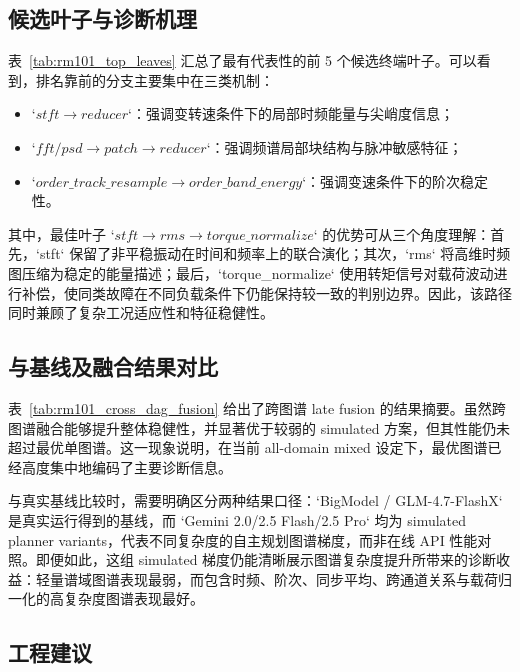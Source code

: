 \subsection{候选叶子与诊断机理}

表~\ref{tab:rm101_top_leaves} 汇总了最有代表性的前 5 个候选终端叶子。可以看到，排名靠前的分支主要集中在三类机制：

\begin{itemize}
    \item `$stft \rightarrow reducer$`：强调变转速条件下的局部时频能量与尖峭度信息；
    \item `$fft/psd \rightarrow patch \rightarrow reducer$`：强调频谱局部块结构与脉冲敏感特征；
    \item `$order\_track\_resample \rightarrow order\_band\_energy$`：强调变速条件下的阶次稳定性。
\end{itemize}



其中，最佳叶子 `$stft \rightarrow rms \rightarrow torque\_normalize$` 的优势可从三个角度理解：首先，`stft` 保留了非平稳振动在时间和频率上的联合演化；其次，`rms` 将高维时频图压缩为稳定的能量描述；最后，`torque\_normalize` 使用转矩信号对载荷波动进行补偿，使同类故障在不同负载条件下仍能保持较一致的判别边界。因此，该路径同时兼顾了复杂工况适应性和特征稳健性。

\subsection{与基线及融合结果对比}

表~\ref{tab:rm101_cross_dag_fusion} 给出了跨图谱 late fusion 的结果摘要。虽然跨图谱融合能够提升整体稳健性，并显著优于较弱的 simulated 方案，但其性能仍未超过最优单图谱。这一现象说明，在当前 all-domain mixed 设定下，最优图谱已经高度集中地编码了主要诊断信息。



与真实基线比较时，需要明确区分两种结果口径：`BigModel / GLM-4.7-FlashX` 是真实运行得到的基线，而 `Gemini 2.0/2.5 Flash/2.5 Pro` 均为 simulated planner variants，代表不同复杂度的自主规划图谱梯度，而非在线 API 性能对照。即便如此，这组 simulated 梯度仍能清晰展示图谱复杂度提升所带来的诊断收益：轻量谱域图谱表现最弱，而包含时频、阶次、同步平均、跨通道关系与载荷归一化的高复杂度图谱表现最好。

\subsection{工程建议}

